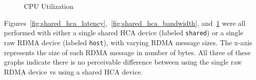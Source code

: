 \documentclass[12pt,titlepage]{article}
\begin{document}
\begin{figure}
	\centering
	\caption{CPU Utilization}%
	\label{fig:shared_hca_cpu}
\end{figure}

Figures~\ref{fig:shared_hca_latency},~\ref{fig:shared_hca_bandwidth}, and~\ref{fig:shared_hca_cpu} were all performed with either a single shared HCA device (labeled \texttt{shared}) or a single raw RDMA device (labeled \texttt{host}), with varying RDMA message sizes.
The x-axis represents the size of each RDMA message in number of bytes.
All three of these graphs indicate there is no perceivable difference between using the single raw RDMA device vs using a shared HCA device.
\end{document}
